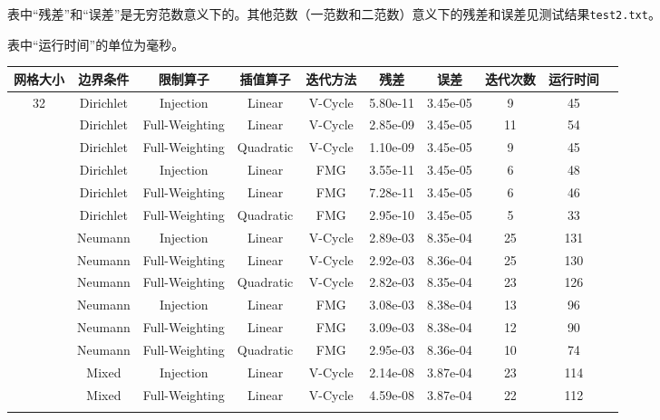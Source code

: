\documentclass{ctexart}
\begin{document}
表中“残差”和“误差”是无穷范数意义下的。其他范数（一范数和二范数）意义下的残差和误差见测试结果\verb|test2.txt|。

表中“运行时间”的单位为毫秒。

\begin{longtable}{cccccccccc} \hline
网格大小 & 边界条件 & 限制算子 & 插值算子 & 迭代方法 & 残差 & 误差 & 迭代次数 & 运行时间\\ \hline
\multirow{18}{*}{32}	& Dirichlet	& Injection			& Linear	& V-Cycle	& 5.80e-11	& 3.45e-05	& 9		& 45		\\ \cline{2-9}
\multirow{18}{*}{}		& Dirichlet	& Full-Weighting	& Linear	& V-Cycle	& 2.85e-09	& 3.45e-05	& 11	& 54		\\ \cline{2-9}
\multirow{18}{*}{}		& Dirichlet	& Full-Weighting	& Quadratic	& V-Cycle	& 1.10e-09	& 3.45e-05	& 9		& 45		\\ \cline{2-9}
\multirow{18}{*}{}		& Dirichlet	& Injection			& Linear	& FMG		& 3.55e-11	& 3.45e-05	& 6		& 48		\\ \cline{2-9}
\multirow{18}{*}{}		& Dirichlet	& Full-Weighting	& Linear	& FMG		& 7.28e-11	& 3.45e-05	& 6		& 46		\\ \cline{2-9}
\multirow{18}{*}{}		& Dirichlet	& Full-Weighting	& Quadratic	& FMG		& 2.95e-10	& 3.45e-05	& 5		& 33		\\ \cline{2-9}
\multirow{18}{*}{}		& Neumann	& Injection			& Linear	& V-Cycle	& 2.89e-03	& 8.35e-04	& 25	& 131		\\ \cline{2-9}
\multirow{18}{*}{}		& Neumann	& Full-Weighting	& Linear	& V-Cycle	& 2.92e-03	& 8.36e-04	& 25	& 130		\\ \cline{2-9}
\multirow{18}{*}{}		& Neumann	& Full-Weighting	& Quadratic	& V-Cycle	& 2.82e-03	& 8.35e-04	& 23	& 126		\\ \cline{2-9}
\multirow{18}{*}{}		& Neumann	& Injection			& Linear	& FMG		& 3.08e-03	& 8.38e-04	& 13	& 96		\\ \cline{2-9}
\multirow{18}{*}{}		& Neumann	& Full-Weighting	& Linear	& FMG		& 3.09e-03	& 8.38e-04	& 12	& 90		\\ \cline{2-9}
\multirow{18}{*}{}		& Neumann	& Full-Weighting	& Quadratic	& FMG		& 2.95e-03	& 8.36e-04	& 10	& 74		\\ \cline{2-9}
\multirow{18}{*}{}		& Mixed		& Injection			& Linear	& V-Cycle	& 2.14e-08	& 3.87e-04	& 23	& 114		\\ \cline{2-9}
\multirow{18}{*}{}		& Mixed		& Full-Weighting	& Linear	& V-Cycle	& 4.59e-08	& 3.87e-04	& 22	& 112		\\ \cline{2-9}

\end{longtable}
\end{document}
